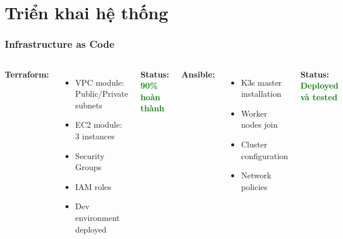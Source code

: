 \documentclass[aspectratio=169]{beamer}
\begin{document}
\section{Triển khai hệ thống}

\begin{frame}
\frametitle{Infrastructure as Code}
\begin{columns}
\textbf{Terraform:}
\begin{itemize}
    \item[$\checkmark$] VPC module: Public/Private subnets
    \item[$\checkmark$] EC2 module: 3 instances
    \item[$\checkmark$] Security Groups
    \item[$\checkmark$] IAM roles
    \item[$\checkmark$] Dev environment deployed
\end{itemize}

\vspace{0.3cm}
\textbf{Status: \textcolor{green}{90\% hoàn thành}}

\textbf{Ansible:}
\begin{itemize}
    \item[$\checkmark$] K3s master installation
    \item[$\checkmark$] Worker nodes join
    \item[$\checkmark$] Cluster configuration
    \item[$\checkmark$] Network policies
\end{itemize}

\vspace{0.3cm}
\textbf{Status: \textcolor{green}{Deployed và tested}}
\end{columns}
\end{frame}
\end{document}
